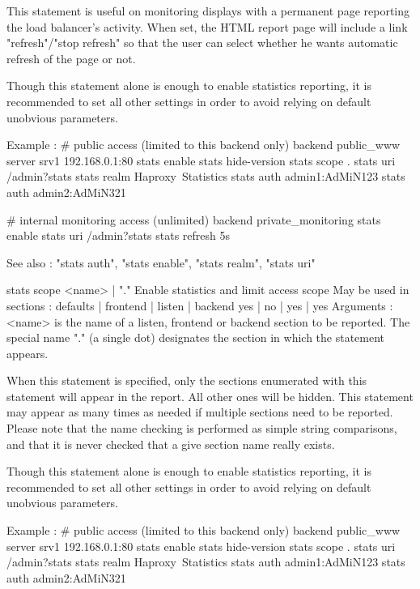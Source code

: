   This statement is useful on monitoring displays with a permanent page
  reporting the load balancer's activity. When set, the HTML report page will
  include a link "refresh"/"stop refresh" so that the user can select whether
  he wants automatic refresh of the page or not.

  Though this statement alone is enough to enable statistics reporting, it is
  recommended to set all other settings in order to avoid relying on default
  unobvious parameters.

  Example :
    # public access (limited to this backend only)
    backend public_www
        server srv1 192.168.0.1:80
        stats enable
        stats hide-version
        stats scope   .
        stats uri     /admin?stats
        stats realm   Haproxy\ Statistics
        stats auth    admin1:AdMiN123
        stats auth    admin2:AdMiN321

    # internal monitoring access (unlimited)
    backend private_monitoring
        stats enable
        stats uri     /admin?stats
        stats refresh 5s

  See also : "stats auth", "stats enable", "stats realm", "stats uri"


stats scope { <name> | "." }
  Enable statistics and limit access scope
  May be used in sections :   defaults | frontend | listen | backend
                                 yes   |    no    |   yes  |   yes
  Arguments :
    <name>    is the name of a listen, frontend or backend section to be
              reported. The special name "." (a single dot) designates the
              section in which the statement appears.

  When this statement is specified, only the sections enumerated with this
  statement will appear in the report. All other ones will be hidden. This
  statement may appear as many times as needed if multiple sections need to be
  reported. Please note that the name checking is performed as simple string
  comparisons, and that it is never checked that a give section name really
  exists.

  Though this statement alone is enough to enable statistics reporting, it is
  recommended to set all other settings in order to avoid relying on default
  unobvious parameters.

  Example :
    # public access (limited to this backend only)
    backend public_www
        server srv1 192.168.0.1:80
        stats enable
        stats hide-version
        stats scope   .
        stats uri     /admin?stats
        stats realm   Haproxy\ Statistics
        stats auth    admin1:AdMiN123
        stats auth    admin2:AdMiN321


